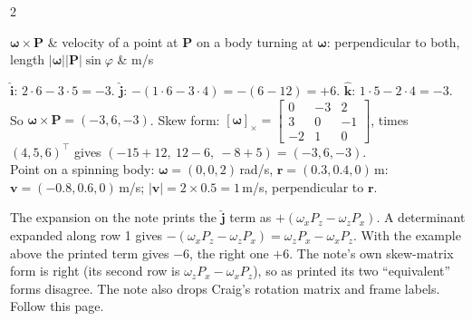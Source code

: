 \begin{multicols}{2}
\begin{fbx}
\begin{symbols}
$\boldsymbol\omega\times\mathbf P$ & velocity of a point at $\mathbf P$ on a body turning at $\boldsymbol\omega$: perpendicular to both, length $|\boldsymbol\omega||\mathbf P|\sin\varphi$ & m/s\\
\end{symbols}
\end{fbx}
\begin{worked}[$\boldsymbol\omega=(1,2,3)$, $\mathbf P=(4,5,6)$]
$\hat{\mathbf i}$: $2\cdot6-3\cdot5=-3$. $\hat{\mathbf j}$: $-(1\cdot6-3\cdot4)=-(6-12)=+6$. $\hat{\mathbf k}$: $1\cdot5-2\cdot4=-3$. So $\boldsymbol\omega\times\mathbf P=(-3,6,-3)$. Skew form: $[\boldsymbol\omega]_\times=\begin{bmatrix}0&-3&2\\3&0&-1\\-2&1&0\end{bmatrix}$, times $(4,5,6)^\top$ gives $(-15+12,\ 12-6,\ -8+5)=(-3,6,-3)$. \chk\\
Point on a spinning body: $\boldsymbol\omega=(0,0,2)$\,rad/s, $\mathbf r=(0.3,0.4,0)$\,m: $\mathbf v=(-0.8,0.6,0)$\,m/s; $|\mathbf v|=2\times0.5=1$\,m/s, perpendicular to $\mathbf r$. \chk
\end{worked}
\begin{slideerr}
The expansion on the note prints the $\hat{\mathbf j}$ term as $+(\omega_xP_z-\omega_zP_x)$. A determinant expanded along row 1 gives $-(\omega_xP_z-\omega_zP_x)=\omega_zP_x-\omega_xP_z$. With the example above the printed term gives $-6$, the right one $+6$. The note's own skew-matrix form is right (its second row is $\omega_zP_x-\omega_xP_z$), so as printed its two ``equivalent'' forms disagree. The note also drops Craig's rotation matrix and frame labels. Follow this page. \chk
\end{slideerr}


\end{multicols}
